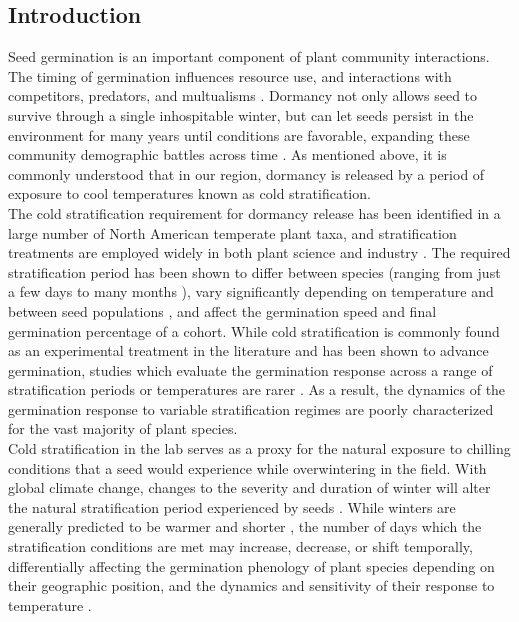 \documentclass[12pt]{article}\usepackage[]{graphicx}\usepackage[]{color}
\begin{document}
\subsection*{Introduction}
\indent\indent Seed germination is an important component of plant community interactions. The timing of germination influences resource use, and interactions with competitors, predators, and multualisms \citep{Korner2008,Rathcke1985,Gioria2018}. Dormancy not only allows seed to survive through a single inhospitable winter, but can let seeds persist in the environment for many years until conditions are favorable, expanding these community demographic battles across time \citep{Long2015}. As mentioned above, it is commonly understood that in our region, dormancy is released by a period of exposure to cool temperatures known as cold stratification.\\
\indent\indent The cold stratification requirement for dormancy release has been identified in a large number of North American temperate plant taxa, and stratification treatments are employed widely in both plant science and industry \citep{Hartmann_2011}. The required stratification period has been shown to differ between species (ranging from just a few days to many months \citep{Luna2009}), vary significantly depending on temperature and between seed populations \citep{Steadman2004}, and affect the germination speed and final germination percentage of a cohort. While cold stratification is commonly found as an experimental treatment in the literature and has been shown to advance germination, studies which evaluate the germination response across a range of stratification periods or temperatures are rarer \citep{Batlla2009}. As a result, the dynamics of the germination response to variable stratification regimes are poorly characterized for the vast majority of plant species.\\
\indent Cold stratification in the lab serves as a proxy for the natural exposure to chilling conditions that a seed would experience while overwintering in the field. With global climate change, changes to the severity and duration of winter will alter the natural stratification period experienced by seeds \citep{Walck2011}. While winters are generally predicted to be warmer and shorter \citep{IPCC_2014}, the number of days which the stratification conditions are met may increase, decrease, or shift temporally, differentially affecting the germination phenology of plant species depending on their geographic position, and the dynamics and sensitivity of their response to temperature \citep{Walck2011}. \\
\end{document}
